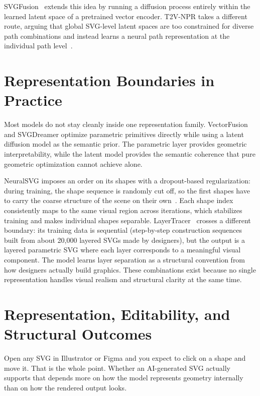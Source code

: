 SVGFusion~\cite{xingSVGFusionScalableTexttoSVG2025} extends this idea by running a diffusion process entirely within the learned latent 
space of a pretrained vector encoder. T2V-NPR takes a different route, arguing that global SVG-level 
latent spaces are too constrained for diverse path combinations and instead learns a neural path representation at the individual 
path level~\cite{zhangTexttoVectorGenerationNeural2024}.

\section{Representation Boundaries in Practice}
\label{sec:rep_boundaries}

Most models do not stay cleanly inside one representation family. VectorFusion and SVGDreamer optimize parametric
primitives directly while using a latent diffusion model as the semantic prior. The parametric layer provides geometric 
interpretability, while the latent model provides the semantic coherence that pure geometric optimization cannot achieve alone.

NeuralSVG imposes an order on its shapes with a dropout-based regularization: during training, the shape sequence 
is randomly cut off, so the first shapes have to carry the coarse structure of the scene on their 
own~\cite{polaczekNeuralSVGImplicitRepresentation2025}. Each shape index consistently maps 
to the same visual region across iterations, which stabilizes training and makes individual shapes separable. 
LayerTracer~\cite{songLayerTracerCognitiveAlignedLayered2025} crosses a different boundary: its training data is sequential 
(step-by-step construction sequences built from about 20,000 layered SVGs made by designers), but the output is a layered parametric SVG where each layer 
corresponds to a meaningful visual component. The model learns layer separation as a structural convention from how designers 
actually build graphics. These combinations exist because no single 
representation handles visual realism and structural clarity at the same time.

\section{Representation, Editability, and Structural Outcomes}
\label{sec:rep_editability}

Open any SVG in Illustrator or Figma and you expect to click on a shape and move it. That is the whole point.
Whether an AI-generated SVG actually supports that depends more on how the model represents geometry internally 
than on how the rendered output looks.


